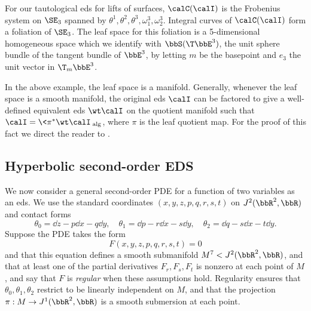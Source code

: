 \begin{example}\label{ex 7.1.10 Ivey contd}
    For our tautological \gls{eds} for lifts of surfaces, $\calC(\calI)$ is the Frobenius system on $\SE_3$ spanned by $\theta^1,\theta^2,\theta^3,\omega^3_1,\omega^3_2$. Integral curves of $\calC(\calI)$ form a foliation of $\SE_3$. The leaf space for this foliation is a 5-dimensional homogeneous space which we identify with $\bbS(\T\bbE^3)$, the unit sphere bundle of the tangent bundle of $\bbE^3$, by letting $m$ be the basepoint and $e_3$ the unit vector in $\T_m\bbE^3$.
\end{example}

In the above example, the leaf space is a manifold. Generally, whenever the leaf space is a smooth manifold, the original \gls{eds} $\calI$ can be factored to give a well-defined equivalent \gls{eds} $\wt\calI$ on the quotient manifold such that $\calI=\<\pi^\ast\wt\calI\>_{\mathrm{alg}}$, where $\pi$ is the leaf quotient map. For the proof of this fact we direct the reader to \cite[Prop.~7.1.20]{Ivey}.














\subsection{Hyperbolic second-order EDS}\label{sec: hyperbolic EDS}


We now consider a general second-order PDE for a function of two variables as an \gls{eds}. We use the standard coordinates $(x,y,z,p,q,r,s,t)$ on $J^2(\bbR^2,\bbR)$ and contact forms 
\[\theta_0=\dd z-p \dd x-q\dd y,\quad \theta_1=\dd p-r\dd x-s\dd y,\quad \theta_2=\dd q-s\dd x-t\dd y.\]
Suppose the PDE takes the form 
\[F(x,y,z,p,q,r,s,t)=0\label{eq 7.10 Ivey}\]
and that this equation defines a smooth submanifold $M^7<J^2(\bbR^2,\bbR)$, and that at least one of the partial derivatives $F_r,F_s,F_t$ is nonzero at each point of $M$, and say that $F$ is \emph{regular} when these assumptions hold. Regularity ensures that $\theta_0,\theta_1,\theta_2$ restrict to be linearly independent on $M$, and that the projection $\pi:M\to J^1(\bbR^2,\bbR)$ is a smooth submersion at each point. 


